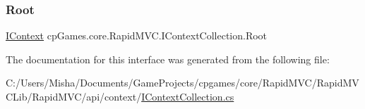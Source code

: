 \subsubsection{\texorpdfstring{Root}{Root}}
{\footnotesize\ttfamily \mbox{\hyperlink{interfacecp_games_1_1core_1_1_rapid_m_v_c_1_1_i_context}{I\+Context}} cp\+Games.\+core.\+Rapid\+M\+V\+C.\+I\+Context\+Collection.\+Root\hspace{0.3cm}{\ttfamily [get]}}



The documentation for this interface was generated from the following file\+:\begin{DoxyCompactItemize}
\item 
C\+:/\+Users/\+Misha/\+Documents/\+Game\+Projects/cpgames/core/\+Rapid\+M\+V\+C/\+Rapid\+M\+V\+C\+Lib/\+Rapid\+M\+V\+C/api/context/\mbox{\hyperlink{_i_context_collection_8cs}{I\+Context\+Collection.\+cs}}\end{DoxyCompactItemize}
